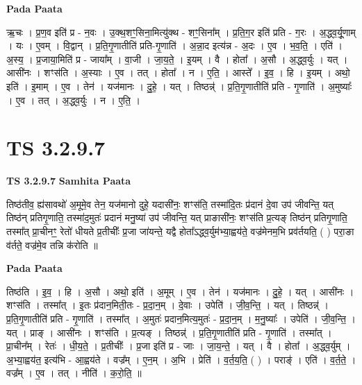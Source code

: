 \documentclass[17pt]{extarticle}
\begin{document}
\textbf{Pada Paata} \newline

ऋ॒चः । प्र॒ण॒व इति॑ प्र - न॒वः । उ॒क्थ॒शꣳ॒॒सिना॒मित्यु॑क्थ - शꣳ॒॒सिना᳚म् । प्र॒ति॒ग॒र इति॑ प्रति - ग॒रः । अ॒द्ध्व॒र्यू॒णाम् । यः । ए॒वम् । वि॒द्वान् । प्र॒ति॒गृ॒णातीति॑ प्रति-गृ॒णाति॑ । अ॒न्ना॒द इत्य॑न्न - अ॒दः । ए॒व । भ॒व॒ति॒ । एति॑ । अ॒स्य॒ । प्र॒जाया॒मिति॑ प्र - जाया᳚म् । वा॒जी । जा॒य॒ते॒ । इ॒यम् । वै । होता᳚ । अ॒सौ । अ॒द्ध्व॒र्युः । यत् । आसी॑नः । शꣳस॑ति । अ॒स्याः । ए॒व । तत् । होता᳚ । न । ए॒ति॒ । आस्ते᳚ । इ॒व॒ । हि । इ॒यम् । अथो॒ इति॑ । इ॒माम् । ए॒व । तेन॑ । यज॑मानः । दु॒हे॒ । यत् । तिष्ठन्न्॑ । प्र॒ति॒गृ॒णातीति॑ प्रति - गृ॒णाति॑ । अ॒मुष्याः᳚ । ए॒व । तत् । अ॒द्ध्व॒र्युः । न । ए॒ति॒ ।  \newline




\section*{ TS 3.2.9.7 }

\textbf{TS 3.2.9.7 } \newline
\textbf{Samhita Paata} \newline

तिष्ठ॑तीव॒ ह्य॑सावथो॑ अ॒मूमे॒व तेन॒ यज॑मानो दुहे॒ यदासी॑नः॒ शꣳस॑ति॒ तस्मा॑दि॒तः प्र॑दानं दे॒वा उप॑ जीवन्ति॒ यत् तिष्ठ॑न् प्रतिगृ॒णाति॒ तस्मा॑द॒मुतः॑ प्रदानं मनु॒ष्या॑ उप॑ जीवन्ति॒ यत् प्राङासी॑नः॒ शꣳस॑ति प्र॒त्यङ् तिष्ठ॑न् प्रतिगृ॒णाति॒ तस्मा᳚त् प्रा॒चीनꣳ॒॒ रेतो॑ धीयते प्र॒तीचीः᳚ प्र॒जा जा॑यन्ते॒ यद्वै होता᳚ऽद्ध्व॒र्युम॑भ्या॒ह्वय॑ते॒ वज्र॑मेनम॒भि प्रव॑र्तयति॒ ( ) परा॒ङा व॑र्तते॒ वज्र॑मे॒व तन्नि क॑रोति ॥ \newline

\textbf{Pada Paata} \newline

तिष्ठ॑ति । इ॒व॒ । हि । अ॒सौ । अथो॒ इति॑ । अ॒मूम् । ए॒व । तेन॑ । यज॑मानः । दु॒हे॒ । यत् । आसी॑नः । शꣳस॑ति । तस्मा᳚त् । इ॒तः प्र॑दान॒मिती॒तः - प्र॒दा॒न॒म् । दे॒वाः । उपेति॑ । जी॒व॒न्ति॒ । यत् । तिष्ठन्न्॑ । प्र॒ति॒गृ॒णातीति॑ प्रति - गृ॒णाति॑ । तस्मा᳚त् । अ॒मुतः॑ प्रदान॒मित्य॒मुतः॑ - प्र॒दा॒न॒म् । म॒नु॒ष्याः᳚ । उपेति॑ । जी॒व॒न्ति॒ । यत् । प्राङ् । आसी॑नः । शꣳस॑ति । प्र॒त्यङ् । तिष्ठन्न्॑ । प्र॒ति॒गृ॒णातीति॑ प्रति - गृ॒णाति॑ । तस्मा᳚त् । प्रा॒चीन᳚म् । रेतः॑ । धी॒य॒ते॒ । प्र॒तीचीः᳚ । प्र॒जा इति॑ प्र - जाः । जा॒य॒न्ते॒ । यत् । वै । होता᳚ । अ॒द्ध्व॒र्युम् । अ॒भ्या॒ह्वय॑त॒ इत्य॑भि - आ॒ह्वय॑ते । वज्र᳚म् । ए॒न॒म् । अ॒भि । प्रेति॑ । व॒र्त॒य॒ति॒ ( ) । पराङ्॑ । एति॑ । व॒र्त॒ते॒ । वज्र᳚म् । ए॒व । तत् । नीति॑ । क॒रो॒ति॒ ॥  \newline
\end{document}

